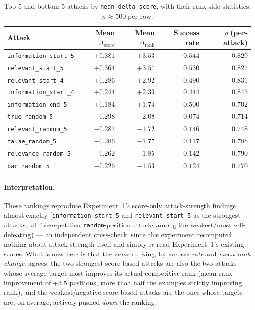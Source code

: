 \documentclass[11pt]{article}
\newcommand{\score}{\operatorname{score}}
\newcommand{\rank}{\operatorname{rank}}
\begin{document}
\begin{table}[H]
\centering
\caption{Top 5 and bottom 5 attacks by \texttt{mean\_delta\_score}, with
their rank-side statistics. $n\approx500$ per row.}
\label{tab:topbottom}
\begin{tabular}{lrrrr}
\toprule
Attack & Mean $\Delta_{\score}$ & Mean $\Delta_{\rank}$ & Success rate & $\rho$ (per-attack) \\
\midrule
\texttt{information\_start\_5} & $+0.381$ & $+3.53$ & $0.544$ & $0.829$ \\
\texttt{relevant\_start\_5}    & $+0.364$ & $+3.57$ & $0.530$ & $0.827$ \\
\texttt{relevant\_start\_4}    & $+0.286$ & $+2.92$ & $0.490$ & $0.831$ \\
\texttt{information\_start\_4} & $+0.244$ & $+2.30$ & $0.444$ & $0.845$ \\
\texttt{information\_end\_5}   & $+0.184$ & $+1.74$ & $0.500$ & $0.702$ \\
\midrule
\texttt{true\_random\_5}      & $-0.298$ & $-2.08$ & $0.074$ & $0.714$ \\
\texttt{relevant\_random\_5}  & $-0.287$ & $-1.72$ & $0.146$ & $0.748$ \\
\texttt{false\_random\_5}     & $-0.286$ & $-1.77$ & $0.117$ & $0.788$ \\
\texttt{relevance\_random\_5} & $-0.262$ & $-1.85$ & $0.142$ & $0.790$ \\
\texttt{bar\_random\_5}       & $-0.226$ & $-1.53$ & $0.124$ & $0.770$ \\
\bottomrule
\end{tabular}
\end{table}

\paragraph{Interpretation.} These rankings reproduce Experiment~1's
score-only attack-strength findings almost exactly (\texttt{information\_start\_5}
and \texttt{relevant\_start\_5} as the strongest attacks, all five-repetition
\texttt{random}-position attacks among the weakest/most self-defeating) ---
an independent cross-check, since this experiment recomputed nothing about
attack strength itself and simply re-read Experiment~1's existing scores.
What is new here is that the \emph{same} ranking, by \emph{success rate}
and \emph{mean rank change}, agrees: the two strongest score-based attacks
are also the two attacks whose average target most improves its actual
competitive rank (mean rank improvement of $+3.5$ positions, more than
half the examples strictly improving rank), and the weakest/negative
score-based attacks are the ones whose targets are, on average, actively
pushed \emph{down} the ranking.
\end{document}
